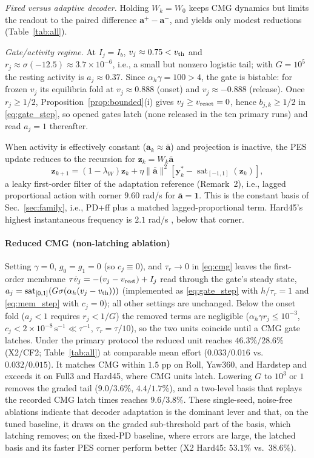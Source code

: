 \documentclass[letterpaper, 10 pt, conference]{ieeeconf}
\newcommand{\sat}{\operatorname{sat}}
\begin{document}
\emph{Fixed versus adaptive decoder.} Holding $W_k=W_0$ keeps CMG dynamics but limits the readout to the paired difference $\bm a^+-\bm a^-$, and yields only modest reductions (Table~\ref{tab:all}).

\emph{Gate/activity regime.} At $I_j=I_b$, $v_j\approx0.75<v_{\rm th}$ and $r_j\approx\sigma(-12.5)\approx3.7\times10^{-6}$, i.e., a small but nonzero logistic tail; with $G=10^5$ the resting activity is $a_j\approx0.37$. Since $\alpha_h\gamma=100>4$, the gate is bistable: for frozen $v_j$ its equilibria fold at $v_j\approx0.888$ (onset) and $v_j\approx-0.888$ (release). Once $r_j\ge1/2$, Proposition~\ref{prop:bounded}(i) gives $v_j\ge v_{\rm reset}=0$, hence $b_{j,k}\ge1/2$ in \eqref{eq:gate_step}, so opened gates latch (none released in the ten primary runs) and read $a_j=1$ thereafter.

When activity is effectively constant ($\bm a_k\approx\bar{\bm a}$) and projection is inactive, the PES update reduces to the recursion for $\bm z_k=W_k\bar{\bm a}$
\begin{equation}
 \bm z_{k+1}=(1-\lambda_W)\bm z_k
 +\eta\|\bar{\bm a}\|^2[\bm y_k^*-\sat_{[-1,1]}(\bm z_k)],
 \label{eq:constantbasis}
\end{equation}
a leaky first-order filter of the adaptation reference (Remark~2), i.e., lagged proportional action with corner $9.60$ rad/s for $\bar{\bm a}=\bm1$. This is the constant basis of Sec.~\ref{sec:family}, i.e., PD+ff plus a matched lagged-proportional term. Hard45's highest instantaneous frequency is $2.1$ rad/s \cite{sandoval2018instantaneous}, below that corner.

\paragraph{Reduced CMG (non-latching ablation)} Setting $\gamma=0$, $g_0=g_1=0$ (so $c_j\equiv0$), and $\tau_r\to0$ in \eqref{eq:cmg} leaves the first-order membrane $\tau\dot v_j=-(v_j-v_{\rm rest})+I_j$ read through the gate's steady state, $a_j=\sat_{[0,1]}(G\sigma(\alpha_h(v_j-v_{\rm th})))$ (implemented as \eqref{eq:gate_step} with $h/\tau_r=1$ and \eqref{eq:mem_step} with $c_j=0$); all other settings are unchanged. Below the onset fold ($a_j<1$ requires $r_j<1/G$) the removed terms are negligible ($\alpha_h\gamma r_j\le10^{-3}$, $c_j<2\times10^{-8}\,\mathrm{s}^{-1}\ll\tau^{-1}$, $\tau_r=\tau/10$), so the two units coincide until a CMG gate latches. Under the primary protocol the reduced unit reaches $46.3\%/28.6\%$ (X2/CF2; Table~\ref{tab:all}) at comparable mean effort ($0.033/0.016$ vs.\ $0.032/0.015$). It matches CMG within $1.5$ pp on Roll, Yaw360, and Hardstep and exceeds it on Full3 and Hard45, where CMG units latch. Lowering $G$ to $10^3$ or $1$ removes the graded tail ($9.0/3.6\%$, $4.4/1.7\%$), and a two-level basis that replays the recorded CMG latch times reaches $9.6/3.8\%$. These single-seed, noise-free ablations indicate that decoder adaptation is the dominant lever and that, on the tuned baseline, it draws on the graded sub-threshold part of the basis, which latching removes; on the fixed-PD baseline, where errors are large, the latched basis and its faster PES corner perform better (X2 Hard45: $53.1\%$ vs.\ $38.6\%$).
\end{document}
